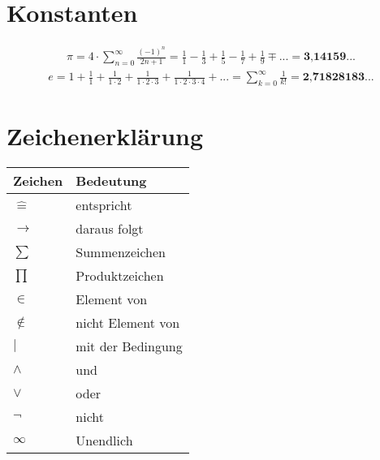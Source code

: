 \documentclass{formulaCollection}
\begin{document}
\section{Konstanten}
\begin{align*} 
\pi =  4 \cdot \sum_{n=0}^\infty  \frac{(-1)^n}{2n+1} = \frac{1}{1} -  \frac{1}{3} +  \frac{1}{5} -  \frac{1}{7} + \frac{1}{9} \mp ... = \textbf{3,14159}...
\end{align*}
\begin{align*} 
e = 1 + \frac{1}{1}+\frac{1}{1 \cdot 2}+\frac{1}{1 \cdot 2  \cdot 3}+\frac{1}{1 \cdot 2  \cdot 3  \cdot 4}+... = \sum_{k=0}^\infty \frac{1}{k!} = \textbf{2,71828183}...
\end{align*}


\section{Zeichenerklärung}

\begin{tabular}[h]{l|l}
Zeichen &Bedeutung  \\
\hline
$\widehat{=}$ & entspricht  \\
$\longrightarrow$ & daraus folgt \\
$\sum$ & Summenzeichen \\
$\prod$ & Produktzeichen \\
$\in$ & Element von \\
$\notin$ & nicht Element von \\
$|$ & mit der Bedingung \\
$\land$ & und \\
$\lor$ & oder \\
$\lnot$ & nicht \\
$\infty$ & Unendlich \\

\end{tabular}
\end{document}
